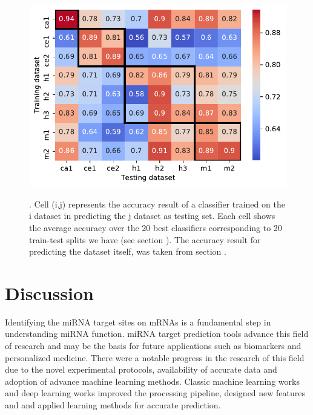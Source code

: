 \documentclass{bmcart}
\begin{document}


\begin{figure}[h!]
  \caption{. Cell (i,j) represents the accuracy result of a classifier trained on the i dataset in predicting the j dataset as testing set. Each cell shows the average accuracy over the 20 best classifiers corresponding to 20 train-test splits we have (see section ). The accuracy result for predicting the dataset itself, was taken from section . }
      \includegraphics[width = 1\textwidth]{Results/diff_summary.pdf}
    \label{fig:crossdataset}
      \end{figure}


\section*{Discussion}
Identifying the miRNA target sites on mRNAs is a fundamental step in understanding miRNA function. miRNA target prediction tools advance this field of research and may be the basis for future applications such as biomarkers and personalized medicine. There were a notable progress in the research of this field due to the novel experimental protocols, availability of accurate data and adoption of advance machine learning methods. Classic machine learning works  and deep learning works  improved the processing pipeline, designed new features and and applied learning methods for accurate prediction. 
\end{document}
